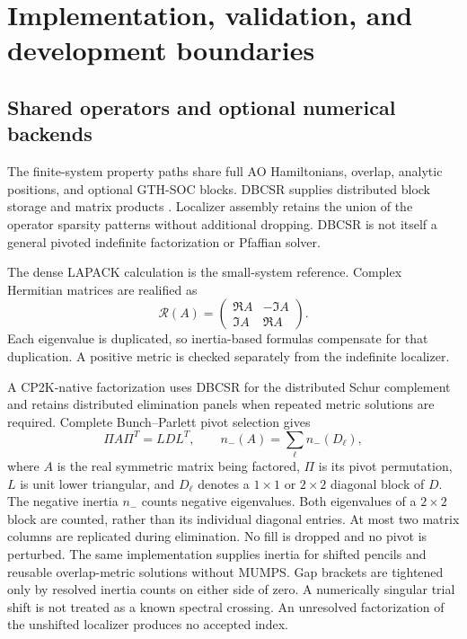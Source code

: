 \section{Implementation, validation, and development boundaries}
\label{sec:validation}
\subsection{Shared operators and optional numerical backends}
The finite-system property paths share full AO Hamiltonians, overlap,
analytic positions, and optional GTH-SOC blocks.
DBCSR supplies distributed block storage and matrix products
\cite{Borstnik2014}. Localizer assembly retains the union of the
operator sparsity patterns without additional dropping.
DBCSR is not itself a general pivoted indefinite factorization or
Pfaffian solver.

The dense LAPACK calculation is the small-system reference.
Complex Hermitian matrices are realified as
\begin{equation}
 \mathcal R(A)=
 \begin{pmatrix}\Re A&-\Im A\\\Im A&\Re A\end{pmatrix}.
\end{equation}
Each eigenvalue is duplicated, so inertia-based formulas compensate
for that duplication. A positive metric is checked separately from
the indefinite localizer.

A CP2K-native factorization uses DBCSR for the distributed Schur
complement and retains distributed elimination panels when repeated
metric solutions are required. Complete Bunch--Parlett pivot selection
\cite{BunchParlett1971} gives
\begin{equation}
 \Pi A\Pi^T=LDL^T,
 \qquad n_-(A)=\sum_\ell n_-(D_\ell),
\end{equation}
where $A$ is the real symmetric matrix being factored, $\Pi$ is its
pivot permutation, $L$ is unit lower triangular, and $D_\ell$ denotes
a $1\times1$ or $2\times2$ diagonal block of $D$.
The negative inertia $n_-$ counts negative eigenvalues.
Both eigenvalues of a $2\times2$ block are counted, rather than its
individual diagonal entries. At most two matrix columns are replicated
during elimination. No fill is dropped and no pivot is perturbed.
The same implementation supplies inertia for shifted pencils and
reusable overlap-metric solutions without MUMPS. Gap brackets are
tightened only by resolved inertia counts on either side of zero.
A numerically singular trial shift is not treated as a known spectral
crossing. An unresolved factorization of the unshifted localizer
produces no accepted index.

